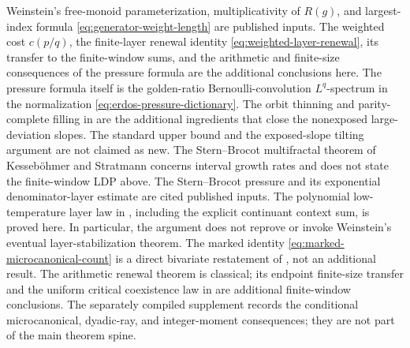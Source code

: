 \else
\begin{remark}
Weinstein's free-monoid parameterization, multiplicativity of \(R(g)\), and
largest-index formula \eqref{eq:generator-weight-length} are published inputs.
The weighted cost \(c(p/q)\), the finite-layer renewal identity
\eqref{eq:weighted-layer-renewal}, its transfer to the finite-window sums, and
the arithmetic and finite-size consequences of the pressure formula are the
additional conclusions here.  The pressure formula itself is the
golden-ratio Bernoulli-convolution \(L^q\)-spectrum in the normalization
\eqref{eq:erdos-pressure-dictionary}.  The orbit thinning and parity-complete
filling in
 are the additional ingredients that close the
nonexposed large-deviation slopes.  The standard upper bound and the
exposed-slope tilting argument are not claimed as new.  The Stern--Brocot
multifractal theorem of Kesseb\"ohmer and Stratmann
\cite{KessebohmerStratmann2004,KessebohmerStratmann2007} concerns interval
 growth rates and does not state the finite-window LDP above.  The
 Stern--Brocot pressure and its exponential denominator-layer estimate are
 cited published inputs.  The polynomial low-temperature layer law in
 , including the explicit continuant
 context sum, is proved here.  In
particular, the argument does not reprove or invoke Weinstein's eventual
layer-stabilization theorem.  The marked identity
\eqref{eq:marked-microcanonical-count} is a direct bivariate restatement of
, not an additional result.  The
arithmetic renewal theorem is classical; its endpoint finite-size transfer
and the uniform critical coexistence law in
 are additional finite-window
conclusions.
The separately compiled supplement records the conditional microcanonical,
dyadic-ray, and integer-moment consequences; they are not part of the main
theorem spine.
\end{remark}
\fi
